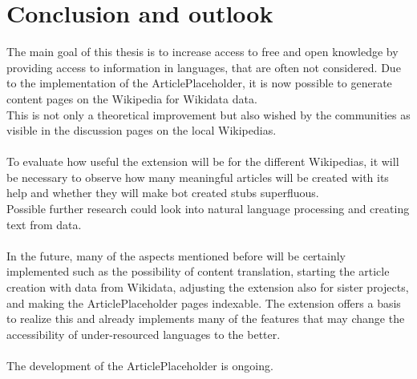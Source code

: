 \chapter{Conclusion and outlook}

The main goal of this thesis is to increase access to free and open knowledge by providing access to information in languages, that are often not considered. Due to the implementation of the ArticlePlaceholder, it is now possible to generate content pages on the Wikipedia for Wikidata data. \\
This is not only a theoretical improvement but also wished by the communities as visible in the discussion pages on the local Wikipedias. \\
\\
To evaluate how useful the extension will be for the different Wikipedias, it will be necessary to observe how many meaningful articles will be created with its help and whether they will make bot created stubs superfluous. \\
Possible further research could look into natural language processing and creating text from data. \\
\\
In the future, many of the aspects mentioned before will be certainly implemented such as the possibility of content translation, starting the article creation with data from Wikidata, adjusting the extension also for sister projects, and making the ArticlePlaceholder pages indexable. The extension offers a basis to realize this and already implements many of the features that may change the accessibility of under-resourced languages to the better. \\
\\
The development of the ArticlePlaceholder is ongoing.

